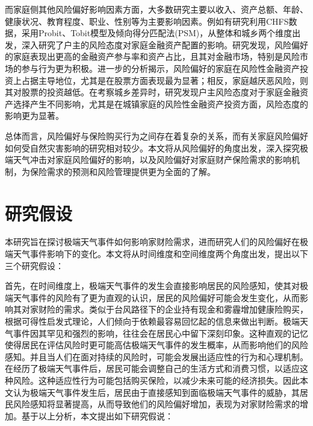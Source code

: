 而家庭侧其他风险偏好影响因素方面，大多数研究主要以收入\citep{石双2018收入与风险偏好}、资产总额\citep{卢亚娟殷君瑶2021户主风险态度对家庭金融资产配置的影响研究}、年龄\citep{王晶2021年龄结构}、健康状况\citep{雷晓燕2010中国家庭的资产组合选择}、教育程度\citep{梁立俊2018受教育程度与主客观风险偏好}、职业\citep{赵颖2017中国劳动者的风险偏好与职业选择}、性别\citep{徐小华2019女性劳动参与会影响家庭资产配置风险偏好吗}等为主要影响因素。例如有研究利用CHFS数据，采用Probit、Tobit模型及倾向得分匹配法(PSM)，从整体和城乡两个维度出发，深入研究了户主的风险态度对家庭金融资产配置的影响\citep{卢亚娟殷君瑶2021户主风险态度对家庭金融资产配置的影响研究}。研究发现，风险偏好的家庭表现出更高的金融资产参与率和资产占比，且其对金融市场，特别是风险市场的参与行为更为积极。进一步的分析揭示，风险偏好的家庭在风险性金融资产投资上占据主导地位，尤其是在股票方面表现最为显著；相反，家庭越厌恶风险，则其对股票的投资越低。在考察城乡差异时，研究发现户主风险态度对于家庭金融资产选择产生不同影响，尤其是在城镇家庭的风险性金融资产投资方面，风险态度的影响更为显著。

总体而言，风险偏好与保险购买行为之间存在着复杂的关系，而有关家庭风险偏好如何受自然灾害影响的研究相对较少。本文将从风险偏好的角度出发，深入探究极端天气冲击对家庭风险偏好的影响，以及风险偏好对家庭财产保险需求的影响机制，为保险需求的预测和风险管理提供更为全面的了解。

\section{研究假设}

本研究旨在探讨极端天气事件如何影响家财险需求，进而研究人们的风险偏好在极端天气事件影响下的变化。本文将从时间维度和空间维度两个角度出发，提出以下三个研究假设：

首先，在时间维度上，极端天气事件的发生会直接影响居民的风险感知，使其对极端天气事件的风险有了更为直观的认识，居民的风险偏好可能会发生变化，从而影响其对家财险的需求。类似于台风路径下的企业持有现金\citep{0Do}和雾霾增加健康险购买\citep{赵强2021空气污染对商业健康保险需求的影响}，根据可得性启发式理论\citep{tversky1973availability}，人们倾向于依赖最容易回忆起的信息来做出判断。极端天气事件因其罕见和强烈的影响，往往会在居民心中留下深刻印象。这种直观的记忆使得居民在评估风险时更可能高估极端天气事件的发生概率，从而影响他们的风险感知。并且当人们在面对持续的风险时，可能会发展出适应性的行为和心理机制\citep{gigerenzer2011heuristic}。在经历了极端天气事件后，居民可能会调整自己的生活方式和消费习惯，以适应这种风险。这种适应性行为可能包括购买保险，以减少未来可能的经济损失。因此本文认为极端天气事件发生后，居民由于直接感知到面临极端天气事件的威胁，其居民风险感知将显著提高，从而导致他们的风险偏好增加，表现为对家财险需求的增加。基于以上分析，本文提出如下研究假说：

